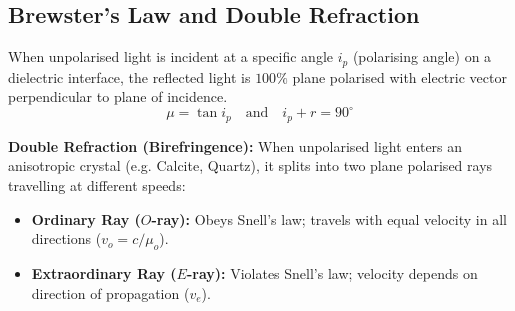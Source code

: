 \documentclass[12pt,a4paper]{article}
\begin{document}
\subsection{Brewster's Law and Double Refraction}

\begin{tcolorbox}[defbox, title={\textbf{Brewster's Law}}]
When unpolarised light is incident at a specific angle $i_p$ (polarising angle) on a dielectric interface, the reflected light is $100\%$ plane polarised with electric vector perpendicular to plane of incidence.
\begin{equation}
\mu = \tan i_p \quad \text{and} \quad i_p + r = 90^\circ
\end{equation}
\end{tcolorbox}

\begin{tcolorbox}[tikzbox, title={Polarisation by Reflection (Brewster's Law)}]
\centering
{}
\end{tcolorbox}

\textbf{Double Refraction (Birefringence):} When unpolarised light enters an anisotropic crystal (e.g. Calcite, Quartz), it splits into two plane polarised rays travelling at different speeds:
\begin{itemize}[leftmargin=*, itemsep=2pt]
  \item \textbf{Ordinary Ray ($O$-ray):} Obeys Snell's law; travels with equal velocity in all directions ($v_o = c/\mu_o$).
  \item \textbf{Extraordinary Ray ($E$-ray):} Violates Snell's law; velocity depends on direction of propagation ($v_e$).
\end{itemize}
\end{document}
